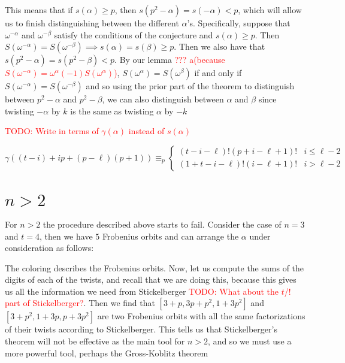 \documentclass[12pt]{article}
\theoremstyle{customtheorem}%
\theoremstyle{remark}
\theoremstyle{definition}
\numberwithin{equation}{section}
\numberwithin{theorem}{section}
\begin{document}
This means that if $s(\alpha) \geq p$, then $s(p^2 - \alpha) = s(-\alpha) < p$, which will allow us to finish distinguishing between the different $\alpha$'s. 
Specifically, suppose that $\omega^{-\alpha}$ and $\omega^{-\beta}$ satisfy the conditions of the conjecture and $s(\alpha) \geq p$. 
Then $S(\omega^{-\alpha}) = S(\omega^{-\beta}) \implies s(\alpha) = s(\beta) \geq p$. 
Then we also have that $s(p^2 - \alpha) = s(p^2 - \beta) < p$. 
By our lemma \textcolor{red}{??? a(because $S(\omega^{-\alpha}) = \omega^{\alpha}(-1)S(\omega^{\alpha})$)}, $S(\omega^\alpha) = S(\omega^\beta)$ if and only if $S(\omega^{-\alpha}) = S(\omega^{-\beta})$ and so using the prior part of the theorem to distinguish between $p^2 - \alpha$ and $p^2 - \beta$, we can also distinguish between $\alpha$ and $\beta$ since twisting $-\alpha$ by $k$ is the same as twisting $\alpha$ by $-k$ 

\textcolor{red}{TODO: Write in terms of $\gamma(\alpha)$ instead of $s(\alpha)$}

\[ \gamma((t-i)+ip + (p - \ell)(p+1)) \equiv_p \begin{cases} (t-i-\ell)!(p+i-\ell+1)! & i \leq \ell -2 \\ (1+t-i-\ell)!(i-\ell+1)!& i > \ell -2 \end{cases}\]

\section{$n>2$}

For $n > 2$ the procedure described above starts to fail. 
Consider the case of $n = 3$ and $t = 4$, then we have $5$ Frobenius orbits and can arrange the $\alpha$ under consideration as follows:

The coloring describes the Frobenius orbits. 
Now, let us compute the sums of the digits of each of the twists, and recall that we are doing this, because this gives us all the information we need from Stickelberger \textcolor{red}{TODO: What about the $t$/$!$ part of Stickelberger?}. 
Then we find that $[3+p,3p+p^2,1+3p^2]$ and $[3+p^2, 1+3p, p+3p^2]$ are two Frobenius orbits with all the same factorizations of their twists according to Stickelberger. 
This tells us that Stickelberger's theorem will not be effective as the main tool for $n > 2$, and so we must use a more powerful tool, perhaps the Gross-Koblitz theorem

%
%
\end{document}
